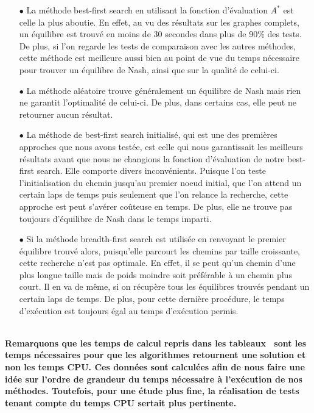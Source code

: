 \begin{itemize}
	\item[$\bullet$] La méthode best-first search en utilisant la fonction  d'évaluation $A^*$ est celle la plus aboutie. En effet, au vu des résultats sur les graphes complets, un équilibre est trouvé en moins de 30 secondes dans plus de 90\% des tests. De plus, si l'on regarde les tests de comparaison avec les autres méthodes, cette méthode est meilleure aussi bien au point de vue du temps nécessaire pour trouver un équilibre de Nash, ainsi que sur la qualité de celui-ci. 
	\item[$\bullet$] La méthode aléatoire trouve généralement un équilibre de Nash mais rien ne garantit l'optimalité de celui-ci. De plus, dans certains cas, elle peut ne retourner aucun résultat.	
	\item[$\bullet$] La méthode de best-first search initialisé, qui est une des premières approches que nous avons testée, est celle qui nous garantissait les meilleurs résultats avant que nous ne changions la fonction d'évaluation de notre best-first search. Elle comporte divers inconvénients. Puisque l'on teste l'initialisation du chemin jusqu'au premier noeud initial, que l'on attend un certain laps de temps puis seulement que l'on relance la recherche, cette approche est peut s'avérer coûteuse en temps. De plus, elle ne trouve pas toujours d'équilibre de Nash dans le temps imparti.
	\item[$\bullet$] Si la méthode breadth-first search est utilisée en renvoyant le premier équilibre trouvé alors, puisqu'elle parcourt les chemins par taille croissante, cette recherche n'est pas optimale. En effet, il se peut qu'un chemin d'une plus longue taille mais de poids moindre soit préférable à un chemin plus court. Il en va de même, si on récupère tous les équilibres trouvés pendant un certain laps de temps. De plus, pour cette dernière procédure, le temps d'exécution est toujours égal au temps d'exécution permis.
\end{itemize}
$ $\\
\textbf{Remarquons que les temps de calcul repris dans les tableaux~ sont les temps nécessaires pour que les algorithmes retournent une solution et non les temps CPU. Ces données sont calculées afin de nous faire une idée sur l'ordre de grandeur du temps nécessaire à l'exécution de nos méthodes. Toutefois, pour une étude plus fine, la réalisation de tests tenant compte du temps CPU sertait plus pertinente.}



